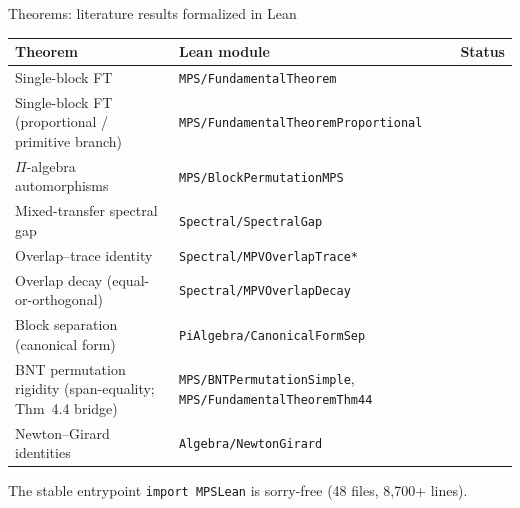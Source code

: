 \documentclass[aspectratio=169,10pt]{beamer}
\begin{document}
\begin{frame}{Theorems: literature results formalized in Lean}
    \vspace{-0.7em}

    \renewcommand{\arraystretch}{1.15}
    \begin{tabular}{p{} p{} p{}}
        \toprule
        \textbf{Theorem} & \textbf{Lean module}                & \textbf{Status} \\
        \midrule
        \rowcolor{cardbg}
        Single-block FT~\cite{Perez-Garcia2007Matrix}
                         & \texttt{MPS/FundamentalTheorem}     & \proved{}       \\
        \rowcolor{cardbg}
        Single-block FT (proportional / primitive branch)~\cite{Cirac2021Matrix}
                         & \texttt{MPS/FundamentalTheoremProportional} & \proved{}  \\
        \rowcolor{cardbg}
        $\Pi$-algebra automorphisms~\cite{Cirac2017Annals}
                         & \texttt{MPS/BlockPermutationMPS}    & \proved{}       \\
        \rowcolor{cardbg}
        Mixed-transfer spectral gap~\cite{Evans1978Spectral,Wolf2012Quantum}
                         & \texttt{Spectral/SpectralGap}       & \proved{}       \\
        \rowcolor{cardbg}
        Overlap--trace identity
                         & \texttt{Spectral/MPVOverlapTrace*}  & \proved{}       \\
        \rowcolor{cardbg}
        Overlap decay (equal-or-orthogonal)
                         & \texttt{Spectral/MPVOverlapDecay}   & \proved{}       \\
        \rowcolor{cardbg}
        Block separation (canonical form)~\cite{Cirac2017Annals,Cirac2021Matrix}
                         & \texttt{PiAlgebra/CanonicalFormSep} & \proved{}       \\
        \rowcolor{cardbg}
        BNT permutation rigidity (span-equality; Thm~4.4 bridge)~\cite{Cirac2021Matrix}
                         & \texttt{MPS/BNTPermutationSimple},
                           \texttt{MPS/FundamentalTheoremThm44}
                         & \proved{}                           \\
        \rowcolor{cardbg}
        Newton--Girard identities
                         & \texttt{Algebra/NewtonGirard}       & \proved{}       \\
        \bottomrule
    \end{tabular}

    \vspace{0.3em}
    \textcolor{dimwhite}{\footnotesize The stable entrypoint \texttt{import MPSLean} is sorry-free (48 files, 8{,}700+ lines).}
\end{frame}
\end{document}
